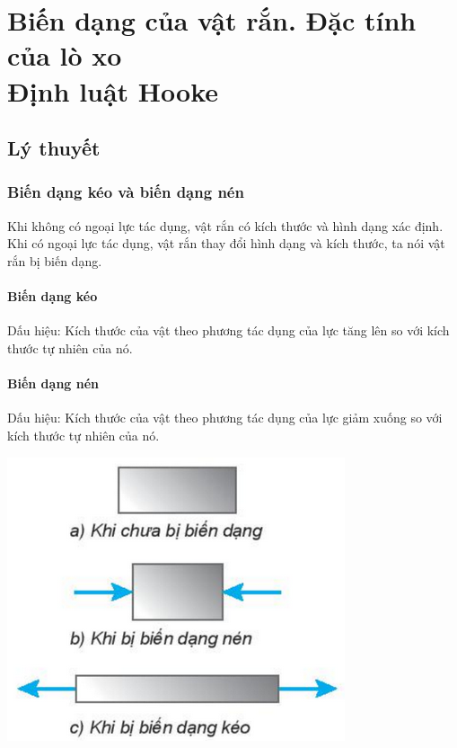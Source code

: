 \let\lesson\undefined
\newcommand{\lesson}{\phantomlesson{Bài 23: Biến dạng của vật rắn. Đặc tính của lò xo. Định luật Hooke}}
\chapter[Biến dạng của vật rắn. Đặc tính của lò xo\\ Định luật Hooke]{Biến dạng của vật rắn. Đặc tính của lò xo\\ Định luật Hooke}
\setcounter{section}{0}
\section{Lý thuyết}
\subsection{Biến dạng kéo và biến dạng nén}
Khi không có ngoại lực tác dụng, vật rắn có kích thước và hình dạng xác định. Khi có ngoại lực tác dụng, vật rắn thay đổi hình dạng và kích thước, ta nói vật rắn bị biến dạng.

\begin{minipage}{0.6\textwidth}
	\subsubsection{Biến dạng kéo}
	Dấu hiệu: Kích thước của vật theo phương tác dụng của lực tăng lên so với kích thước tự nhiên của nó.
	\subsubsection{Biến dạng nén}
	Dấu hiệu: Kích thước của vật theo phương tác dụng của lực giảm xuống so với kích thước tự nhiên của nó.
\end{minipage}
\begin{minipage}{0.4\textwidth}
	\begin{center}
		\includegraphics[scale=0.6]{../figs/G10-028-1}
	\end{center}
\end{minipage}
